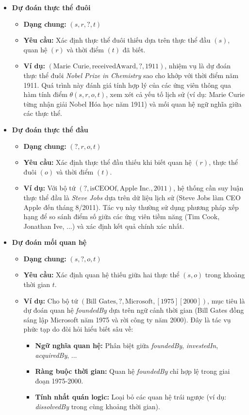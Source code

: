 \begin{itemize}
    \item \textbf{Dự đoán thực thể đuôi}
    \begin{itemize}
        \item \textbf{Dạng chung:} $(s, r, ?, t)$
        \item \textbf{Yêu cầu:} Xác định thực thể đuôi thiếu dựa trên thực thể đầu $(s)$, quan hệ $(r)$ và thời điểm $(t)$ đã biết.
        \item \textbf{Ví dụ:} $(\text{Marie Curie}, \text{receivedAward}, ?, 1911)$, nhiệm vụ là dự đoán thực thể đuôi \textit{Nobel Prize in Chemistry} sao cho khớp với thời điểm năm 1911. Quá trình này đánh giá tính hợp lý của các ứng viên thông qua hàm tính điểm $\theta(s, r, o, t)$, xem xét cả yếu tố lịch sử (ví dụ: Marie Curie từng nhận giải Nobel Hóa học năm 1911) và mối quan hệ ngữ nghĩa giữa các thực thể.
    \end{itemize}
    \item \textbf{Dự đoán thực thể đầu}
    \begin{itemize}
        \item \textbf{Dạng chung:} $(?, r, o, t)$
        \item \textbf{Yêu cầu:} Xác định thực thể đầu thiếu khi biết quan hệ $(r)$, thực thể đuôi $(o)$ và thời điểm $(t)$.
        \item \textbf{Ví dụ:} Với bộ tứ $(?, \text{isCEOOf}, \text{Apple Inc.}, 2011)$, hệ thống cần suy luận thực thể đầu là \textit{Steve Jobs} dựa trên dữ liệu lịch sử (Steve Jobs làm CEO Apple đến tháng 8/2011). Tác vụ này thường sử dụng phương pháp xếp hạng để so sánh điểm số giữa các ứng viên tiềm năng (Tim Cook, Jonathan Ive, ...) và xác định kết quả chính xác nhất.
    \end{itemize}
    \item \textbf{Dự đoán mối quan hệ}
    \begin{itemize}
        \item \textbf{Dạng chung:} $(s, ?, o, t)$
        \item \textbf{Yêu cầu:} Xác định quan hệ thiếu giữa hai thực thể $(s, o)$ trong khoảng thời gian $t$.
        \item \textbf{Ví dụ:} Cho bộ tứ $(\text{Bill Gates}, ?, \text{Microsoft}, [1975][2000])$, mục tiêu là dự đoán quan hệ \textit{foundedBy} dựa trên ngữ cảnh thời gian (Bill Gates đồng sáng lập Microsoft năm 1975 và rời công ty năm 2000). Đây là tác vụ phức tạp do đòi hỏi hiểu biết sâu về:
        \begin{itemize}
            \item \textbf{Ngữ nghĩa quan hệ:} Phân biệt giữa \textit{foundedBy}, \textit{investedIn}, \textit{acquiredBy}, ...
            \item \textbf{Ràng buộc thời gian:} Quan hệ \textit{foundedBy} chỉ hợp lệ trong giai đoạn 1975-2000.
            \item \textbf{Tính nhất quán logic:} Loại bỏ các quan hệ trái ngược (ví dụ: \textit{dissolvedBy} trong cùng khoảng thời gian).
        \end{itemize}
    \end{itemize}
\end{itemize}

